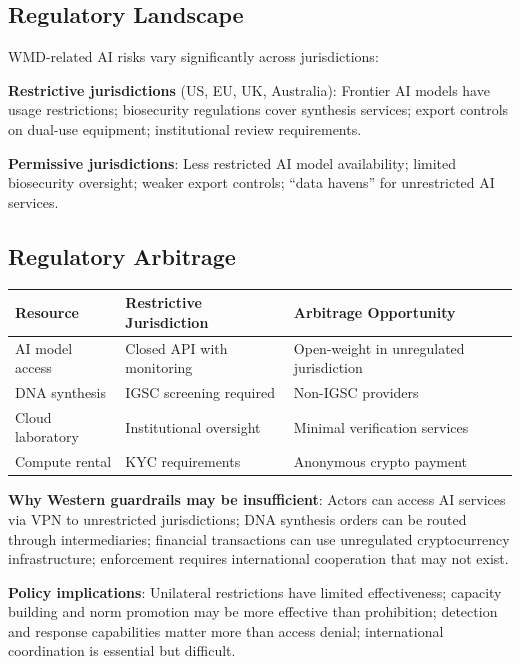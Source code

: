 \documentclass[11pt,letterpaper]{article}
\begin{document}
\subsection{Regulatory Landscape}

WMD-related AI risks vary significantly across jurisdictions:

\textbf{Restrictive jurisdictions} (US, EU, UK, Australia): Frontier AI models have usage restrictions; biosecurity regulations cover synthesis services; export controls on dual-use equipment; institutional review requirements.

\textbf{Permissive jurisdictions}: Less restricted AI model availability; limited biosecurity oversight; weaker export controls; ``data havens'' for unrestricted AI services.

\subsection{Regulatory Arbitrage}

\begin{center}
\small
\begin{tabular}{L{3.5cm}L{4cm}L{4.5cm}}
\toprule
\textbf{Resource} & \textbf{Restrictive Jurisdiction} & \textbf{Arbitrage Opportunity} \\
\midrule
AI model access & Closed API with monitoring & Open-weight in unregulated jurisdiction \\
DNA synthesis & IGSC screening required & Non-IGSC providers \\
Cloud laboratory & Institutional oversight & Minimal verification services \\
Compute rental & KYC requirements & Anonymous crypto payment \\
\bottomrule
\end{tabular}
\end{center}

\textbf{Why Western guardrails may be insufficient}: Actors can access AI services via VPN to unrestricted jurisdictions; DNA synthesis orders can be routed through intermediaries; financial transactions can use unregulated cryptocurrency infrastructure; enforcement requires international cooperation that may not exist.

\textbf{Policy implications}: Unilateral restrictions have limited effectiveness; capacity building and norm promotion may be more effective than prohibition; detection and response capabilities matter more than access denial; international coordination is essential but difficult.
\end{document}
